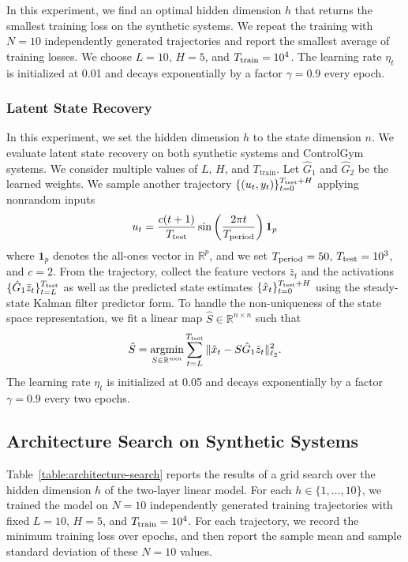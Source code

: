 \documentclass[11pt]{article}
\newcommand{\R}{\mathbb{R}}				%
\newcommand{\<}{\langle}
\renewcommand{\>}{\rangle}
\numberwithin{equation}{section}
\DeclareMathOperator*{\argmin}{argmin}
\newcommand{\sd}[1]{\textcolor{teal}{[sd: #1]}}
\begin{document}
In this experiment, we find an optimal hidden dimension $h$ that returns the smallest training loss on the synthetic systems. 
We repeat the training with $N=10$ independently generated trajectories and report the smallest average of training losses.
We choose $L=10$, $H=5$, and $T_{\rm train}=10^4$. 
The learning rate $\eta_t$ is initialized at 0.01 and decays exponentially by a factor $\gamma=0.9$ every epoch.


\subsubsection{Latent State Recovery} \label{subsubsec:latent-state-recovery}

In this experiment, we set the hidden dimension $h$ to the state dimension $n$.
We evaluate latent state recovery on both synthetic systems and ControlGym systems.
We consider multiple values of $L$, $H$, and $T_\mathrm{train}$.
Let $\hat G_1$ and $\hat G_2$ be the learned weights. 
We sample another trajectory $\{(u_t,y_t)\}_{t=0}^{T_{\rm test}+H}$ applying nonrandom inputs 
\begin{align*}
    u_t = \frac{c(t+1)}{T_{\rm test}}\sin\left(\frac{2\pi t}{T_{\rm period}}\right)\mathbf{1}_p
\end{align*}
where $\mathbf{1}_p$ denotes the all-ones vector in $\R^p$, and we set $T_{\rm period}=50$, $T_{\rm test}=10^3$, and $c=2$.
From the trajectory, collect the feature vectors $\bar z_t$ and the activations $\{\hat G_1 \bar z_t\}_{t=L}^{T_{\rm test}}$ as well as the predicted state estimates $\{\hat x_t\}_{t=0}^{T_{\rm test}+H}$ using the steady-state Kalman filter predictor form.
To handle the non-uniqueness of the state space representation, we fit a linear map $\hat S \in \R^{n \times n}$ such that
\begin{equation} \label{eqn:latent-state-recovery}
    \hat S = \argmin_{S \in \R^{n\! \times \! n}} \sum_{t=L}^{T_{\rm test}}\|\hat x_t - S \hat G_1 \bar z_t\|_{\ell_2}^2.
\end{equation}
The learning rate $\eta_t$ is initialized at 0.05 and decays exponentially by a factor $\gamma=0.9$ every two epochs.


\subsection{Architecture Search on Synthetic Systems}

Table~\ref{table:architecture-search} reports the results of a grid search over the hidden dimension $h$ of the two-layer linear model.
For each $h \in \{1,\dots,10\}$, we trained the model on $N=10$ independently generated training trajectories with fixed $L=10$, $H=5$, and $T_{\rm train}=10^4$.
For each trajectory, we record the minimum training loss over epochs, and then report the sample mean and sample standard deviation of these $N=10$ values. 
\end{document}
